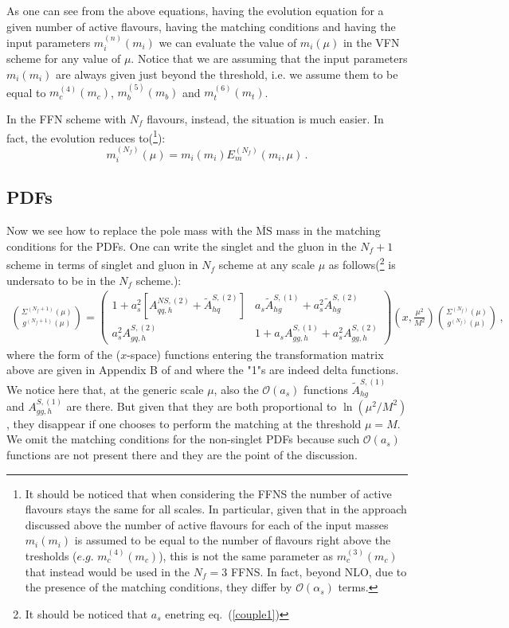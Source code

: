 \documentclass[10pt,a4paper]{article}
\begin{document}
As one can see from the above equations, having the evolution equation for a given number of active flavours, having the matching conditions and having the input parameters $m_i^{(n)}(m_i)$ we can evaluate the value of $m_i(\mu)$ in the VFN scheme for any value of $\mu$. Notice that we are assuming that the input parameters $m_i(m_i)$ are always given just beyond the threshold, i.e. we assume them to be equal to $m_c^{(4)}(m_c)$, $m_b^{(5)}(m_b)$ and $m_t^{(6)}(m_t)$. 

In the FFN scheme with $N_f$ flavours, instead, the situation is much
easier. In fact, the evolution reduces to(\footnote{It should be
  noticed that when considering the FFNS the number of active flavours
  stays the same for all scales. In particular, given that in the
  approach discussed above the number of active flavours for each of
  the input masses $m_i(m_i)$ is assumed to be equal to the number of
  flavours right above the tresholds ($e.g.$ $m_c^{(4)}(m_c)$), this
  is not the same parameter as $m_c^{(3)}(m_c)$ that instead would be
  used in the $N_f=3$ FFNS. In fact, beyond NLO, due to the presence
  of the matching conditions, they differ by $\mathcal{O}(\alpha_s)$
  terms.}):
\begin{equation}
m_i^{(N_f)}(\mu) = m_i(m_i)E_m^{(N_f)}(m_i,\mu)\,.
\end{equation} 


\subsection{PDFs}

Now we see how to replace the pole mass with the
$\overline{\mbox{MS}}$ mass in the matching conditions for the
PDFs. One can write the singlet and the gluon in the $N_f+1$ scheme in
terms of singlet and gluon in $N_f$ scheme at any scale $\mu$ as
follows(\footnote{It should be noticed that $a_s$ enetring
  eq.~(\ref{couple1})} is undersato to be in the $N_f$ scheme.):
\begin{equation}\label{couple1}
\begin{array}{c}
\displaystyle {\Sigma^{(N_f+1)}(\mu) \choose g^{(N_f+1)}(\mu)}=\begin{pmatrix}1+a_s^2[A_{qq,h}^{N\!S,(2)}+\tilde{A}^{S,(2)}_{hq}] & a_s\tilde{A}^{S,(1)}_{hg}+a_s^2\tilde{A}^{S,(2)}_{hg}\\
a_s^2A^{S,(2)}_{gq,h} & 1+a_sA_{gg,h}^{S,(1)}+a_s^2A_{gg,h}^{S,(2)}\end{pmatrix}\left(x,\frac{\mu^2}{M^2}\right){\Sigma^{(N_f)}(\mu) \choose g^{(N_f)}(\mu)}\,,
\end{array}
\end{equation}
where the form of the ($x$-space) functions entering the
transformation matrix above are given in Appendix B of
\cite{Buza:1996wv} and where the "1"s are indeed delta functions. We
notice here that, at the generic scale $\mu$, also the
$\mathcal{O}(a_s)$ functions $\tilde{A}^{S,(1)}_{hg}$ and
$A_{gg,h}^{S,(1)}$ are there. But given that they are both
proportional to $\ln(\mu^2/M^2)$, they disappear if one chooses to
perform the matching at the threshold $\mu=M$. We omit the matching
conditions for the non-singlet PDFs because such $\mathcal{O}(a_s)$
functions are not present there and they are the point of the
discussion.
\end{document}
